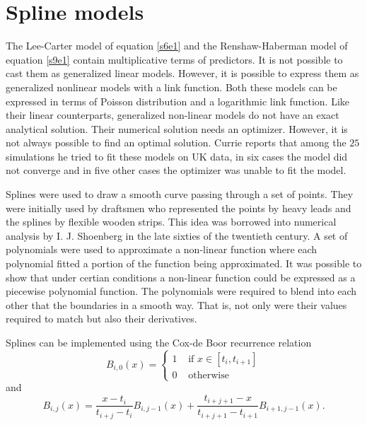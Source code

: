 \documentclass{article}
\numberwithin{equation}{section}
\begin{document}
\section{Spline models}\label{s13}
The Lee-Carter model of equation \eqref{s6e1} and the Renshaw-Haberman model
of equation \eqref{s9e1} contain multiplicative terms of predictors. It is 
not possible to cast them as generalized linear models. However, it is possible
to express them as generalized nonlinear models with a link function. Both
these models can be expressed in terms of Poisson distribution and a logarithmic
link function. Like their linear counterparts, generalized non-linear models
do not have an exact analytical solution. Their numerical solution needs an
optimizer. However, it is not always possible to find an optimal solution.
Currie reports that \cite{currie2013fitting} among the $25$ simulations he
tried to fit these models on UK data, in six cases the model did not converge
and in five other cases the optimizer was unable to fit the model. 

Splines were used to draw a smooth curve passing through a set of points. They
were initially used by draftsmen who represented the points by heavy leads and
the splines by flexible wooden strips. This idea was borrowed into numerical
analysis by I. J. Shoenberg \cite{schoenberg1969cardinal} in the late sixties
of the twentieth century. A set of polynomials were used to approximate a
non-linear function where each polynomial fitted a portion of the function
being approximated. It was possible to show that under certian conditions
\cite{schoenberg1969cardinal} a non-linear function could be expressed as a 
piecewise polynomial function. The polynomials were required to blend into each
other that the boundaries in a smooth way. That is, not only were their values
required to match but also their derivatives.

Splines can be implemented using the Cox-de Boor recurrence relation
\cite{de1978practical}
\begin{equation}\label{s13e1}
B_{i,0}(x) = \begin{cases}
1 & \text{ if } x \in [t_i, t_{i+1}] \\
0 & \text{ otherwise}
\end{cases}
\end{equation}
and
\begin{equation}\label{s13e2}
B_{i,j}(x) = \frac{x - t_i}{t_{i+j} - t_i}B_{i,j-1}(x) + 
\frac{t_{i+j+1}-x}{t_{i+j+1}-t_{i+1}}B_{i+1,j-1}(x).
\end{equation}
\end{document}
